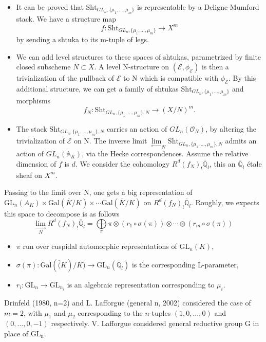 \documentclass[aspectratio=1610]{ctexbeamer}
\def  \Gal      {\mathrm{Gal}}
\def  \leftlim  {\underset{\longleftarrow}{\lim}}
\def  \rightlim {\underset{\longrightarrow}{\lim}}
\def  \ce       {\mathcal{E}}
\def  \co       {\mathcal{O}}
\def  \bq       {\mathbb{Q}}
\begin{document}
\begin{frame}
\begin{itemize}

\item It can  be proved that $\mathrm{Sht}_{GL_n, \{\mu_1, \dots, \mu_m\}}$ is representable by a Deligne-Mumford stack. We have a structure map
$$
f:\mathrm{Sht}_{GL_n, \{\mu_1, \dots, \mu_m\}} \to X^m
$$
by sending  a shtuka to its m-tuple of legs. 

\item We can add level structures to these spaces of shtukas, parametrized by finite closed subscheme $N \subset X$. A level N-structure on $(\ce, \phi_{\ce})$ is then a trivialization of the pullback of $\ce$ to N which is compatible with $\phi_{\ce}$. By this additional structure, we can get a family of shtukas $\mathrm{Sht}_{GL_n, \{\mu_1, \dots, \mu_m\}}$ and morphisms
$$
f_N: \mathrm{Sht}_{GL_n, \{\mu_1, \dots, \mu_m\},N}  \to (X/N)^m.
$$
\item The stack $\mathrm{Sht}_{GL_n, \{\mu_1, \dots, \mu_m\},N}$ carries an action of $GL_n(\co_N)$, by altering the trivialization of $\ce$ on N. The inverse limit $\leftlim_N \mathrm{Sht}_{GL_n, \{\mu_1, \dots, \mu_m\},N}$ admits an action of $GL_n(\mathbb{A}_K)$, via the Hecke correspondences. 
Assume the relative dimension of $f$ is $d$. We consider the cohomology $R^d(f_N)_! \overline{\bq}_l$, this an  $\overline{\bq}_l$ \'etale sheaf on $X^m$.

\end{itemize}
\end{frame}





\begin{frame}
	Passing to the limit over N, one gets a big representation of $\mathrm{GL}_n(A_K) \times \Gal(\overline{K}/K) \times  \cdots \Gal(\overline{K}/K)$  on $R^d(f_N)_! \overline{\bq}_l$.  Roughly,  we expects this space to decompose is as follows
	$$
	\underset{N}{\rightlim}R^d(f_N)_! \overline{\bq}_l = \underset{\pi}{\bigoplus}  \pi \otimes(r_1  \circ \sigma(\pi)) \otimes   \cdots  \otimes (r_m  \circ \sigma(\pi))
	$$
	\begin{itemize}
		\item $\pi$ run over cuspidal automorphic representations of $\mathrm{GL}_n(K)$,
		\item $\sigma(\pi): \Gal(\overline(K)/K) \to \mathrm{GL}_n(\overline{\bq}_l)$ is the corresponding L-parameter,
		\item  $r_i: \mathrm{GL}_n \to \mathrm{GL}_{n_i}$ is an algebraic representation corresponding to $\mu_i$.
	\end{itemize}
   Drinfeld (1980, n=2) and L. Lafforgue (general n, 2002) considered the case of $m=2$, with $\mu_1$ and $\mu_2$ corresponding to the $n$-tuples $(1, 0, \dots, 0)$ and $(0, \dots, 0, -1)$ respectively.  V. Lafforgue considered general reductive group G in place of $\mathrm{GL_n}$.
\end{frame}
\end{document}
